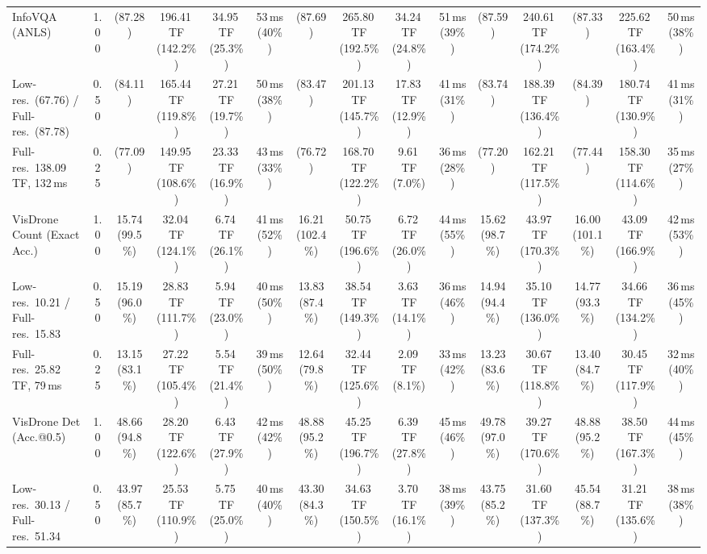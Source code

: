 \begin{table}[t]
{\begin{tabular}{l c | c c c c | c c c c | c c | c c c}
\cmidrule(lr){1-15}
InfoVQA (ANLS) & 1.00 & (87.28) & 196.41\,TF (142.2\%) & 34.95\,TF (25.3\%) & 53\,ms (40\%) & (87.69) & 265.80\,TF (192.5\%) & 34.24\,TF (24.8\%) & 51\,ms (39\%) & (87.59) & 240.61\,TF (174.2\%) & (87.33) & 225.62\,TF (163.4\%) & 50\,ms (38\%) \\
{\footnotesize Low-res.\ (67.76) / Full-res.\ (87.78)} & 0.50 & (84.11) & 165.44\,TF (119.8\%) & 27.21\,TF (19.7\%) & 50\,ms (38\%) & (83.47) & 201.13\,TF (145.7\%) & 17.83\,TF (12.9\%) & 41\,ms (31\%) & (83.74) & 188.39\,TF (136.4\%) & (84.39) & 180.74\,TF (130.9\%) & 41\,ms (31\%) \\
{\footnotesize Full-res.\ 138.09\,TF, 132\,ms} & 0.25 & (77.09) & 149.95\,TF (108.6\%) & 23.33\,TF (16.9\%) & 43\,ms (33\%) & (76.72) & 168.70\,TF (122.2\%) & 9.61\,TF (7.0\%) & 36\,ms (28\%) & (77.20) & 162.21\,TF (117.5\%) & (77.44) & 158.30\,TF (114.6\%) & 35\,ms (27\%) \\
\cmidrule(lr){1-15}
VisDrone Count (Exact Acc.) & 1.00 & \cellcolor{gray!15}15.74 (99.5\%) & 32.04\,TF (124.1\%) & 6.74\,TF (26.1\%) & 41\,ms (52\%) & \cellcolor{gray!15}16.21 (102.4\%) & 50.75\,TF (196.6\%) & 6.72\,TF (26.0\%) & 44\,ms (55\%) & \cellcolor{gray!15}15.62 (98.7\%) & 43.97\,TF (170.3\%) & \cellcolor{gray!15}16.00 (101.1\%) & 43.09\,TF (166.9\%) & 42\,ms (53\%) \\
{\footnotesize Low-res.\ 10.21 / Full-res.\ 15.83} & 0.50 & 15.19 (96.0\%) & 28.83\,TF (111.7\%) & 5.94\,TF (23.0\%) & 40\,ms (50\%) & 13.83 (87.4\%) & 38.54\,TF (149.3\%) & 3.63\,TF (14.1\%) & 36\,ms (46\%) & 14.94 (94.4\%) & 35.10\,TF (136.0\%) & 14.77 (93.3\%) & 34.66\,TF (134.2\%) & 36\,ms (45\%) \\
{\footnotesize Full-res.\ 25.82\,TF, 79\,ms} & 0.25 & 13.15 (83.1\%) & 27.22\,TF (105.4\%) & 5.54\,TF (21.4\%) & 39\,ms (50\%) & 12.64 (79.8\%) & 32.44\,TF (125.6\%) & 2.09\,TF (8.1\%) & 33\,ms (42\%) & 13.23 (83.6\%) & 30.67\,TF (118.8\%) & 13.40 (84.7\%) & 30.45\,TF (117.9\%) & 32\,ms (40\%) \\
\cmidrule(lr){1-15}
VisDrone Det (Acc.@0.5) & 1.00 & 48.66 (94.8\%) & 28.20\,TF (122.6\%) & 6.43\,TF (27.9\%) & 42\,ms (42\%) & 48.88 (95.2\%) & 45.25\,TF (196.7\%) & 6.39\,TF (27.8\%) & 45\,ms (46\%) & 49.78 (97.0\%) & 39.27\,TF (170.6\%) & 48.88 (95.2\%) & 38.50\,TF (167.3\%) & 44\,ms (45\%) \\
{\footnotesize Low-res.\ 30.13 / Full-res.\ 51.34} & 0.50 & 43.97 (85.7\%) & 25.53\,TF (110.9\%) & 5.75\,TF (25.0\%) & 40\,ms (40\%) & 43.30 (84.3\%) & 34.63\,TF (150.5\%) & 3.70\,TF (16.1\%) & 38\,ms (39\%) & 43.75 (85.2\%) & 31.60\,TF (137.3\%) & 45.54 (88.7\%) & 31.21\,TF (135.6\%) & 38\,ms (38\%) \\

\end{tabular}}
\end{table}
